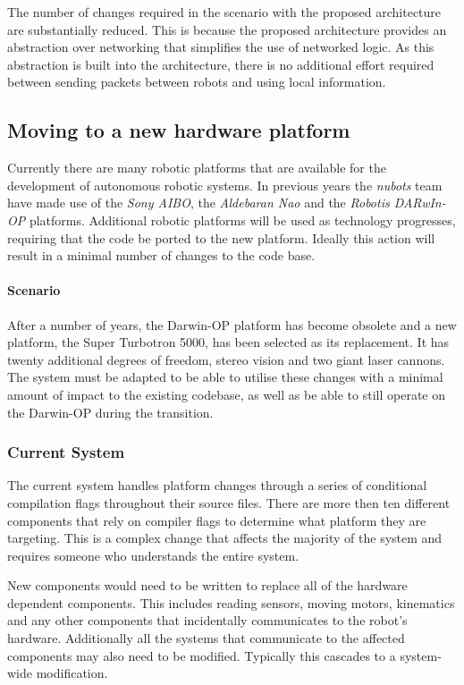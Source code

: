 \documentclass[english,12pt]{scrartcl}
\begin{document}
				The number of changes required in the scenario with the proposed architecture are substantially reduced.
				This is because the proposed architecture provides an abstraction over networking that simplifies the use of networked logic.
				As this abstraction is built into the architecture, there is no additional effort required between sending packets between robots and using local information.

		\subsection{Moving to a new hardware platform}
			Currently there are many robotic platforms that are available for the development of autonomous
			robotic systems. In previous years the \emph{\gls{nubots}} team have made use of the \emph{Sony AIBO},
			the \emph{Aldebaran Nao} and the \emph{Robotis DARwIn-OP} platforms. Additional robotic platforms will be used as technology progresses, requiring that the code be ported to the new platform.
			Ideally this action will result in a minimal number of changes to the code base.

			\paragraph{Scenario} After a number of years, the Darwin-OP platform has become obsolete and a new platform, the Super Turbotron 5000, has been selected as its replacement. It has twenty
			additional degrees of freedom, stereo vision and two giant laser cannons. The system must be
			adapted to be able to utilise these changes with a minimal amount of impact to the existing codebase, as well as be able to still operate on the Darwin-OP during the transition.

			\subsubsection{Current System}
				The current system handles platform changes through a series of conditional compilation flags throughout their source files.
				There are more then ten different components that rely on compiler flags to determine what platform they are targeting.
				This is a complex change that affects the majority of the system and requires someone who understands the entire system.

				New components would need to be written to replace all of the hardware dependent components. This includes reading sensors, moving motors, kinematics and any other components that incidentally communicates to the robot's hardware.
				Additionally all the systems that communicate to the affected components may also need to be modified.
				Typically this cascades to a system-wide modification.
\end{document}
